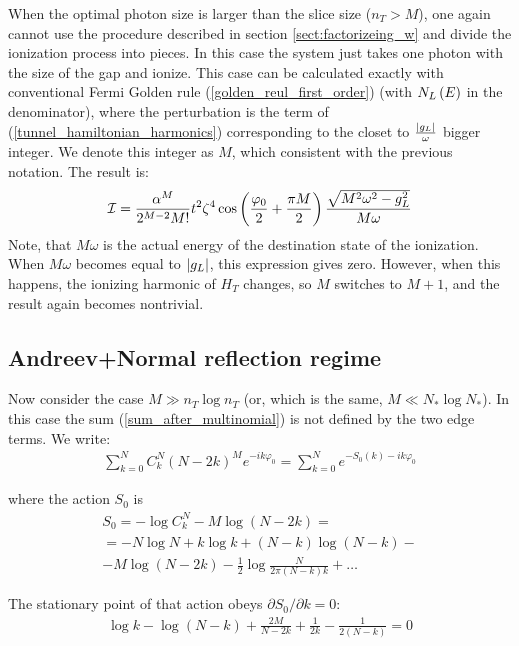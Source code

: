 When the optimal photon size is larger than the slice size ($ n_T>M $), one again cannot use the procedure described in section \ref{sect:factorizeing_w} and divide the ionization process into pieces. In this case the system just takes one photon with the size of the gap and ionize. This case can be calculated exactly with conventional Fermi Golden rule (\ref{golden_reul_first_order}) (with $ N_L\left(E\right) $ in the denominator), where the perturbation is the term of (\ref{tunnel_hamiltonian_harmonics}) corresponding to the closet to $ \frac{\left|g_L\right|}{\omega} $ bigger integer. We denote this integer as $ M $, which consistent with the previous notation. The result is:
\begin{gather}
	\mathcal{I}
	=
	\frac
	{\alpha^M}{2^{M-2}M!}
	t^2\zeta^4
	\cos
	\left(
		\frac{\varphi_0}{2}
		+
		\frac{\pi M}{2}
	\right)
	\frac
	{\sqrt{M^2\omega^2-g_L^2}}
	{M\omega}
\end{gather}
Note, that $ M\omega $ is the actual energy of the destination state of the ionization. When $ M\omega $ becomes equal to $ \left|g_L\right| $, this expression gives zero. However, when this happens,  the ionizing harmonic of $ H_T $ changes, so $ M $ switches to $ M+1 $, and the result again becomes nontrivial.
\subsection{Andreev+Normal reflection regime}

Now consider the case $M\gg n_T\log n_T$ (or, which is the same, $ M\ll N_*\log N_* $).
In this case the sum (\ref{sum_after_multinomial}) is not defined by the two edge terms.
We write:
\begin{gather}
\sum_{k=0}^{N}C_{k}^{N}(N-2k)^{M}e^{-ik\varphi_0}=\sum_{k=0}^{N}e^{-S_{0}(k)-ik\varphi_0}
\end{gather}

where the action $S_{0}$ is 
\begin{multline}
S_{0}=-\log C_{k}^{N}-M\log(N-2k)
=
\\
=
-N\log N+k\log k+(N-k)\log(N-k)-
\\
-M\log(N-2k)-\frac{1}{2}\log\frac{N}{2\pi(N-k)k}+\dots
\end{multline}

The stationary point of that action obeys $\partial S_{0}/\partial k=0$:
\begin{gather}
	\log k-\log(N-k)+\frac{2M}{N-2k}+\frac{1}{2k}-\frac{1}{2(N-k)}=0
\end{gather}



